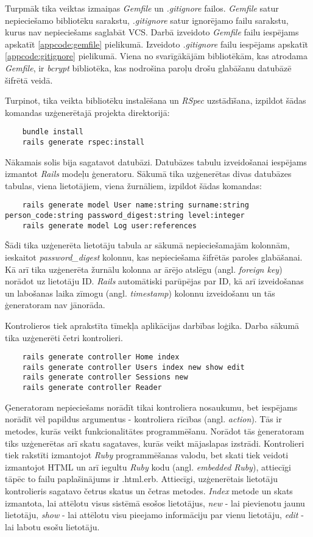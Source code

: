Turpmāk tika veiktas izmaiņas \textit{Gemfile} un \textit{.gitignore} failos. \textit{Gemfile} satur nepieciešamo bibliotēku sarakstu, \textit{.gitignore} satur ignorējamo failu sarakstu, kurus nav nepieciešams saglabāt VCS.
Darbā izveidoto \textit{Gemfile} failu iespējams apskatīt \ref{appcode:gemfile} pielikumā. Izveidoto \textit{.gitignore} failu iespējams apskatīt \ref{appcode:gitignore} pielikumā.
Viena no svarīgākājām bibliotēkām, kas atrodama \textit{Gemfile}, ir \textit{bcrypt} bibliotēka, kas nodrošina paroļu drošu glabāšanu datubāzē šifrētā veidā.

Turpinot, tika veikta bibliotēku instalēšana un \textit{RSpec} uzstādīšana, izpildot šādas komandas uzģenerētajā projekta direktorijā:
\begin{lstlisting}
	bundle install
	rails generate rspec:install
\end{lstlisting}

Nākamais solis bija sagatavot datubāzi. Datubāzes tabulu izveidošanai iespējams izmantot \textit{Rails} modeļu ģeneratoru. Sākumā tika uzģenerētas divas datubāzes tabulas, viena lietotājiem, viena žurnāliem, izpildot šādas komandas:
\begin{lstlisting}
	rails generate model User name:string surname:string person_code:string password_digest:string level:integer
	rails generate model Log user:references
\end{lstlisting}
Šādi tika uzģenerēta lietotāju tabula ar sākumā nepieciešamajām kolonnām, ieskaitot \textit{password_digest} kolonnu, kas nepieciešama šifrētās paroles glabāšanai. Kā arī tika uzģenerēta žurnālu kolonna ar ārējo atslēgu (angl. \textit{foreign key}) norādot uz lietotāju ID. \textit{Rails} automātiski parūpējas par ID, kā arī izveidošanas un labošanas laika zīmogu (angl. \textit{timestamp}) kolonnu izveidošanu un tās ģeneratoram nav jānorāda.

Kontrolieros tiek aprakstīta tīmekļa aplikācijas darbības loģika. Darba sākumā tika uzģenerēti četri kontrolieri.
\begin{lstlisting}
	rails generate controller Home index
	rails generate controller Users index new show edit
	rails generate controller Sessions new
	rails generate controller Reader
\end{lstlisting}
Ģeneratoram nepieciešams norādīt tikai kontroliera nosaukumu, bet iespējams norādīt vēl papildus argumentus - kontroliera rīcības (angl. \textit{action}). Tās ir metodes, kurās veikt funkcionalitātes programmēšanu. Norādot tās ģeneratoram tiks uzģenerētas arī skatu sagataves, kurās veikt mājaslapas izstrādi. Kontrolieri tiek rakstīti izmantojot \textit{Ruby} programmēšanas valodu, bet skati tiek veidoti izmantojot HTML un arī iegultu \textit{Ruby} kodu (angl. \textit{embedded Ruby}), attiecīgi tāpēc to failu paplašinājums ir .html.erb. Attiecīgi, uzģenerētais lietotāju kontrolieris sagatavo četrus skatus un četras metodes. \textit{Index} metode un skats izmantota, lai attēlotu visus sistēmā esošos lietotājus, \textit{new} - lai pievienotu jaunu lietotāju, \textit{show} - lai attēlotu visu pieejamo informāciju par vienu lietotāju, \textit{edit} - lai labotu esošu lietotāju.

